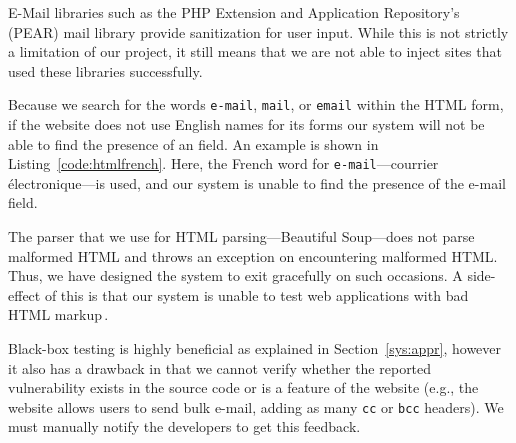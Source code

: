         E-Mail libraries such as the PHP Extension and Application Repository's (PEAR) mail library provide sanitization for user input. While this is not strictly a limitation of our project, it still means that we are not able to inject sites that used these libraries successfully.

        Because we search for the words \texttt{e-mail}, \texttt{mail}, or \texttt{email} within the HTML form, if the website does not use English names for its forms our system will not be able to find the presence of an \email field. An example is shown in Listing~\ref{code:htmlfrench}. Here, the French word for \texttt{e-mail}---courrier électronique---is used, and our system is unable to find the presence of the e-mail field. 

        The parser that we use for HTML parsing---Beautiful Soup---does not parse malformed HTML and throws an exception on encountering malformed HTML. Thus, we have designed the system to exit gracefully on such occasions. A side-effect of this is that our system is unable to test web applications with bad HTML markup\,\footnotemark.


        Black-box testing is highly beneficial as explained in Section~\ref{sys:appr}, however it also has a drawback in that we cannot verify whether the reported vulnerability exists in the source code or is a feature of the website (e.g., the website allows users to send bulk e-mail, adding as many \texttt{cc} or \texttt{bcc} headers). We must manually notify the developers to get this feedback.



